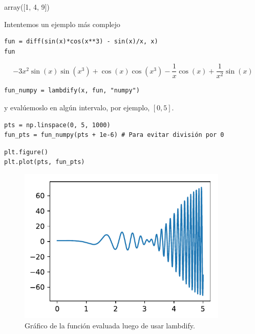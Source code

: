 array({[}1, 4, 9{]})

Intentemos un ejemplo más complejo

\begin{listing}[H]
\begin{verbatim}
fun = diff(sin(x)*cos(x**3) - sin(x)/x, x)
fun
\end{verbatim}
\end{listing}

\[- 3 x^{2} \sin{\left (x \right )} \sin{\left (x^{3} \right )} + \cos{\left (x \right )} \cos{\left (x^{3} \right )} - \frac{1}{x} \cos{\left (x \right )} + \frac{1}{x^{2}} \sin{\left (x \right )}\]

\begin{listing}[H]
\begin{verbatim}
fun_numpy = lambdify(x, fun, "numpy")
\end{verbatim}
\end{listing}

y evalúemoslo en algún intervalo, por ejemplo, \([0, 5]\).

\begin{listing}[H]
\begin{verbatim}
pts = np.linspace(0, 5, 1000)
fun_pts = fun_numpy(pts + 1e-6) # Para evitar división por 0
\end{verbatim}
\end{listing}

\begin{listing}[H]
\begin{verbatim}
plt.figure()
plt.plot(pts, fun_pts)
\end{verbatim}
\end{listing}

\begin{figure}[H]
	\centering
	\includegraphics[width=10cm]{img/sympy/sympy_lambdify}
	\caption{Gráfico de la función evaluada luego de usar lambdify.}
	\label{fig:grafico_lambdify}
\end{figure}

